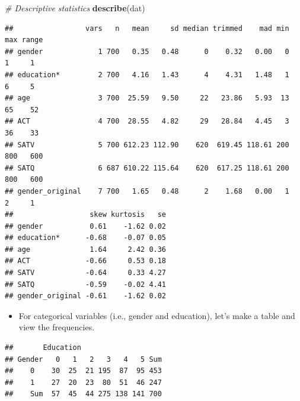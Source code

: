 \documentclass[
]{book}
\newenvironment{Shaded}{\begin{snugshade}}{\end{snugshade}}
\newcommand{\AttributeTok}[1]{\textcolor[rgb]{0.13,0.29,0.53}{#1}}
\newcommand{\CommentTok}[1]{\textcolor[rgb]{0.56,0.35,0.01}{\textit{#1}}}
\newcommand{\FunctionTok}[1]{\textcolor[rgb]{0.13,0.29,0.53}{\textbf{#1}}}
\newcommand{\NormalTok}[1]{#1}
\newcommand{\OtherTok}[1]{\textcolor[rgb]{0.56,0.35,0.01}{#1}}
\newcommand{\SpecialCharTok}[1]{\textcolor[rgb]{0.81,0.36,0.00}{\textbf{#1}}}
\providecommand{\tightlist}{%
  \setlength{\itemsep}{0pt}\setlength{\parskip}{0pt}}
\begin{document}
\begin{Shaded}
\begin{Highlighting}[]
\CommentTok{\# Descriptive statistics}
\FunctionTok{describe}\NormalTok{(dat)}
\end{Highlighting}
\end{Shaded}

\begin{verbatim}
##                 vars   n   mean     sd median trimmed    mad min max range
## gender             1 700   0.35   0.48      0    0.32   0.00   0   1     1
## education*         2 700   4.16   1.43      4    4.31   1.48   1   6     5
## age                3 700  25.59   9.50     22   23.86   5.93  13  65    52
## ACT                4 700  28.55   4.82     29   28.84   4.45   3  36    33
## SATV               5 700 612.23 112.90    620  619.45 118.61 200 800   600
## SATQ               6 687 610.22 115.64    620  617.25 118.61 200 800   600
## gender_original    7 700   1.65   0.48      2    1.68   0.00   1   2     1
##                  skew kurtosis   se
## gender           0.61    -1.62 0.02
## education*      -0.68    -0.07 0.05
## age              1.64     2.42 0.36
## ACT             -0.66     0.53 0.18
## SATV            -0.64     0.33 4.27
## SATQ            -0.59    -0.02 4.41
## gender_original -0.61    -1.62 0.02
\end{verbatim}

\begin{itemize}
\tightlist
\item
  For categorical variables (i.e., gender and education), let's make a table and view the frequencies.
\end{itemize}

\begin{Shaded}
\end{Shaded}

\begin{verbatim}
##       Education
## Gender   0   1   2   3   4   5 Sum
##    0    30  25  21 195  87  95 453
##    1    27  20  23  80  51  46 247
##    Sum  57  45  44 275 138 141 700
\end{verbatim}
\end{document}
